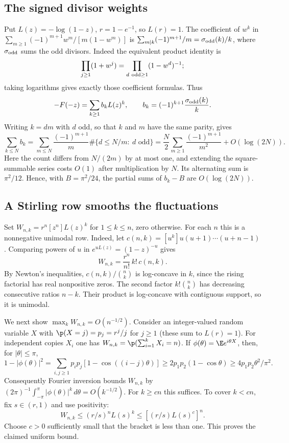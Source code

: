 \documentclass[11pt,a4paper]{article}
\numberwithin{equation}{section}
\theoremstyle{definition}
\theoremstyle{remark}
\begin{document}
\subsection*{The signed divisor weights}
Put $L(z)=-\log(1-z)$, $r=1-e^{-1}$, so $L(r)=1$. The coefficient of $w^k$ in $\sum_{m\ge1}(-1)^{m+1}w^m/[m(1-w^m)]$ is $\sum_{m\mid k}(-1)^{m+1}/m=\sigma_{\rm odd}(k)/k$, where $\sigma_{\rm odd}$ sums the odd divisors. Indeed the equivalent product identity is
\[
 \prod_{j\ge1}(1+w^j)=\prod_{d\ {\rm odd}\ge1}(1-w^d)^{-1};
\]
taking logarithms gives exactly those coefficient formulas. Thus
\[
 -F(-z)=\sum_{k\ge1} b_k L(z)^k,\qquad
 b_k=(-1)^{k+1}\frac{\sigma_{\rm odd}(k)}k .
\]
Writing $k=dm$ with $d$ odd, so that $k$ and $m$ have the same parity, gives
\[
 \sum_{k\le N} b_k
 =\sum_{m\le N}\frac{(-1)^{m+1}}m
          \#\{d\le N/m:\ d\text{ odd}\}
 =\frac{N}{2}\sum_{m\ge1}\frac{(-1)^{m+1}}{m^2}+O(\log(2N)).
\]
Here the count differs from $N/(2m)$ by at most one, and extending the square-summable series costs $O(1)$ after multiplication by $N$. Its alternating sum is $\pi^2/12$. Hence, with $B=\pi^2/24$, the partial sums of $b_k-B$ are $O(\log(2N))$.


\subsection*{A Stirling row smooths the fluctuations}
Set $W_{n,k}=r^n[z^n]L(z)^k$ for $1\le k\le n$, zero otherwise. For each $n$ this is a nonnegative unimodal row. Indeed, let $c(n,k)=[u^k]u(u+1)\cdots(u+n-1)$. Comparing powers of $u$ in $e^{uL(z)}=(1-z)^{-u}$ gives
\[
 W_{n,k}=\frac{r^n}{n!}\,k!\,c(n,k).
\]
By Newton's inequalities, $c(n,k)/\binom{n}{k}$ is log-concave in $k$, since the rising factorial has real nonpositive zeros. The second factor $k!\binom{n}{k}$ has decreasing consecutive ratios $n-k$. Their product is log-concave with contiguous support, so it is unimodal.

We next show $\max_k W_{n,k}=O(n^{-1/2})$. Consider an integer-valued random variable $X$ with $\p(X=j)=p_j=r^j/j$ for $j\ge1$ (these sum to $L(r)=1$). For independent copies $X_i$ one has $W_{n,k}=\p(\sum_{i=1}^k X_i=n)$. If $\phi(\theta)=\E e^{i\theta X}$, then, for $|\theta|\le\pi$,
\[
 1-|\phi(\theta)|^2
 =\sum_{i,j\ge1}p_i p_j[1-\cos((i-j)\theta)]
 \ge 2p_1p_2(1-\cos\theta)\ge 4p_1p_2\theta^2/\pi^2.
\]
Consequently Fourier inversion bounds $W_{n,k}$ by $(2\pi)^{-1}\int_{-\pi}^{\pi}|\phi(\theta)|^k\,d\theta=O(k^{-1/2})$. For $k\ge c n$ this suffices. To cover $k< c n$, fix $s\in(r,1)$ and use positivity:
\[
 W_{n,k}\le(r/s)^n L(s)^k\le[(r/s)L(s)^c]^n .
\]
Choose $c>0$ sufficiently small that the bracket is less than one. This proves the claimed uniform bound.
\end{document}
